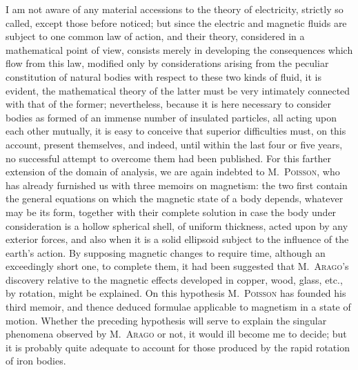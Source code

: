 \documentclass[12pt,notitlepage]{amsart}
\let\Person\textsc
\begin{document}
I am not aware of any material accessions to the theory of electricity,
strictly so called, except those before noticed; but since the electric and
magnetic fluids are subject to one common law of action, and their theory,
considered in a mathematical point of view, consists merely in developing the
consequences which flow from this law, modified only by considerations arising
from the peculiar constitution of natural bodies with respect to these two kinds
of fluid, it is evident, the mathematical theory of the latter must be
very intimately connected with that of the former;
nevertheless, because it is here
necessary to consider bodies as formed of an immense number of insulated
particles, all acting upon each other mutually, it is easy to conceive that
superior difficulties must, on this account,
present themselves, and indeed, until
within the last four or five years, no successful attempt to overcome them had
been published. For this farther extension of the domain of analysis, we are
again indebted to M.~\Person{Poisson},
who has already furnished us with three memoirs on magnetism:
the two first contain the general equations on which the
magnetic state of a body depends, whatever may be its form, together with
their complete solution in case the body under consideration is a hollow 
spherical shell, of uniform thickness,
acted upon by any exterior forces, and also
when it is a solid ellipsoid subject to the influence of the earth's action. By
supposing magnetic changes to require time, although an exceedingly short one,
to complete them, it had been suggested that M.~\Person{Arago}'s
discovery relative
to the magnetic effects developed in copper, wood, glass, etc., by rotation,
might be explained. On this hypothesis M.~\Person{Poisson}
has founded his third memoir,
and thence deduced formulae applicable to magnetism in a state of motion.
Whether the preceding hypothesis will serve to explain the singular phenomena
observed by M.~\Person{Arago} or not,
it would ill become me to decide; but it is
probably quite adequate to account for those produced by the rapid rotation of
iron bodies.
\end{document}
